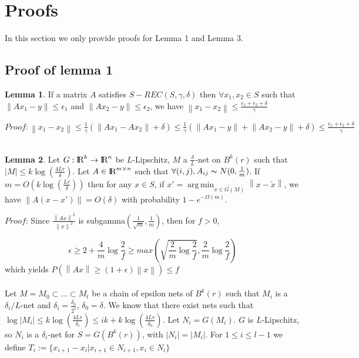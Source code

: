 \documentclass{article}
\newcommand\norm[1]{\left\lVert#1\right\rVert}
\def\R{\textrm{I\kern-0.21emR}}
\theoremstyle{definition}
\theoremstyle{lemma}
\newtheorem{lemma}{Lemma}[section]
\theoremstyle{theorem}
\DeclareMathOperator*{\argmin}{arg\,min}
\begin{document}
\section{Proofs}

In this section we only provide proofs for Lemma 1 and Lemma 3.

\subsection{Proof of lemma 1}
\begin{lemma}
If a matrix $A$ satisfies $S-REC(S,\gamma,\delta)$ then $\forall x_1, x_2 \in S$ such that $\norm{Ax_1 - y} \leq \epsilon_1$ and $\norm{Ax_2 - y} \leq \epsilon_2$, we have $ \norm{x_1 - x_2} \leq \frac{\epsilon_1 + \epsilon_2 + \delta}{\gamma}$
\end{lemma}

$Proof: \norm{x_1 - x_2} \leq \frac{1}{\gamma}(\norm{Ax_1 - Ax_2} + \delta) \leq \frac{1}{\gamma}(\norm{Ax_1 - y} + \norm{ Ax_2 - y} + \delta) \leq \frac{\epsilon_1 + \epsilon_2 + \delta}{\gamma} $
\hfill \\\\
\begin{lemma}
Let $G : \R^k \rightarrow \R^n$ be $L$-Lipschitz, $M$ a $\frac{\delta}{L}$-net on $B^k(r)$ such that $|M| \leq k \log(\frac{4Lr}{\delta})$. Let $A \in \R^{m \times n}$ such that $\forall (i,j), A_{ij} \thicksim N(0, \frac{1}{m})$. If $m=O(k \log(\frac{Lr}{\delta}))$ then for any $x\in S$, if $x' = \argmin_{\tilde{x \in G(M)}} \norm{x - \tilde{x}}$, we have $\norm{A(x-x')} = O(\delta)$ with probability $1 - e^{-\Omega(m)}$.
\end{lemma}

$Proof$: Since $\frac{\norm{Ax}^2}{\norm{x}^2}$ is subgamma$(\frac{1}{\sqrt{m}}, \frac{1}{m})$, then for $f>0$, 

$$ \epsilon \geq 2 + \frac{4}{m} \log \frac{2}{f} \geq max( \sqrt{\frac{2}{m} \log \frac{2}{f}}, \frac{2}{m} \log \frac{2}{f})$$ which yields $P(\norm{Ax} \geq (1+\epsilon)\norm{x}) \leq f$
\\ \\
Let $M = M_0 \subset ... \subset M_t$ be a chain of epsilon nets of $B^k(r)$ such that $M_i$ is a $\delta_i/L$-net and $\delta_i = \frac{\delta_0}{2^i}$, $\delta_0 = \delta$.  We know that there exist nets such that $\log |M_i| \leq k \log(\frac{4Lr}{\delta_i}) \leq ik + k \log(\frac{4Lr}{\delta_0}) $.\newline
Let $N_i = G(M_i)$. $G$ is $L$-Lipschitz, so $N_i$ is a $\delta_i$-net for $S = G(B^k(r))$, with $|N_i| = |M_i|$. For $1 \leq i \leq l-1$ we define $T_i := \{ x_{i+1} - x_i | x_{i+1} \in N_{i+1}, x_i \in N_i\}$
\end{document}
